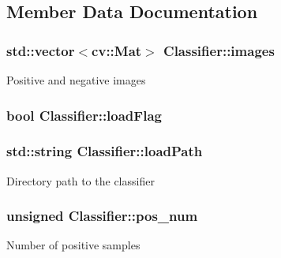 \subsection{Member Data Documentation}
\subsubsection[{\texorpdfstring{images}{images}}]{\setlength{\rightskip}{0pt plus 5cm}std\+::vector$<$cv\+::\+Mat$>$ Classifier\+::images\hspace{0.3cm}{\ttfamily [protected]}}\hypertarget{classClassifier_a0e360b1afe3f9536d631c1825da4089e}{}\label{classClassifier_a0e360b1afe3f9536d631c1825da4089e}
Positive and negative images 
\subsubsection[{\texorpdfstring{load\+Flag}{loadFlag}}]{\setlength{\rightskip}{0pt plus 5cm}bool Classifier\+::load\+Flag\hspace{0.3cm}{\ttfamily [protected]}}\hypertarget{classClassifier_a5ab000d06e39c7774eb13b6b8ccc655f}{}\label{classClassifier_a5ab000d06e39c7774eb13b6b8ccc655f}
\subsubsection[{\texorpdfstring{load\+Path}{loadPath}}]{\setlength{\rightskip}{0pt plus 5cm}std\+::string Classifier\+::load\+Path\hspace{0.3cm}{\ttfamily [protected]}}\hypertarget{classClassifier_a30a4d25e9c20e8f58653393153cbedd2}{}\label{classClassifier_a30a4d25e9c20e8f58653393153cbedd2}
Directory path to the classifier 
\subsubsection[{\texorpdfstring{pos\+\_\+num}{pos_num}}]{\setlength{\rightskip}{0pt plus 5cm}unsigned Classifier\+::pos\+\_\+num\hspace{0.3cm}{\ttfamily [protected]}}\hypertarget{classClassifier_a252037d44fd43cf0e289a1ef6f139489}{}\label{classClassifier_a252037d44fd43cf0e289a1ef6f139489}
Number of positive samples 
